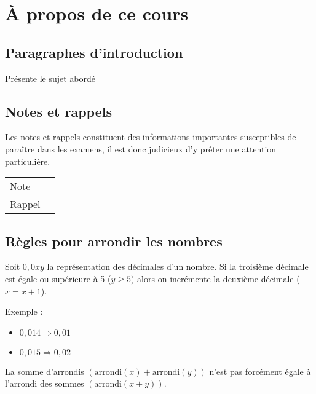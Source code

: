 \chapter*{À propos de ce cours}



\section*{Paragraphes d'introduction}
\begin{intro}
	Présente le sujet abordé 
\end{intro}



\section*{Notes et rappels}
\begin{note}
	Les notes et rappels constituent des informations importantes susceptibles de paraître dans les examens, il est donc judicieux d'y prêter une attention particulière.
	\begin{center}
		\begin{tabular}{l@{\qquad}l}
			Note   & \Large\righthand \\
			Rappel & \Large\aldine
		\end{tabular}
	\end{center}
\end{note}



\section*{Règles pour arrondir les nombres}
Soit $0,0xy$ la représentation des décimales d'un nombre. Si la troisième décimale est égale ou supérieure à 5 ($y \geq 5$) alors on incrémente la deuxième décimale ($x = x + 1$).

Exemple :
\begin{itemize}
	\item $0,014 \Rightarrow 0,01$
	\item $0,015 \Rightarrow 0,02$
\end{itemize}

\marginpar{\color{BrickRed}\Large{\danger}}
La somme d'arrondis \( (\text{arrondi}(x)+\text{arrondi}(y)) \) n’est pas forcément égale à l’arrondi des sommes \( (\text{arrondi}(x+y) ) \).

